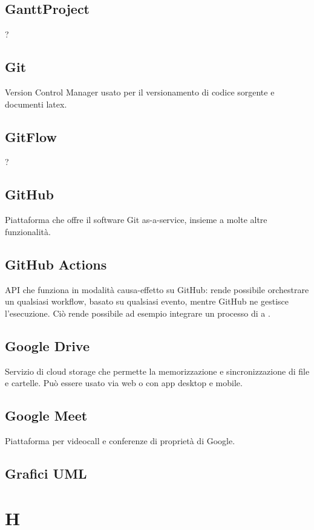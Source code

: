 \subsection*{GanttProject}
?

\subsection*{Git}
Version Control Manager usato per il versionamento di codice sorgente e documenti latex.

\subsection*{GitFlow}
?

\subsection*{GitHub}
Piattaforma che offre il software Git as-a-service, insieme a molte altre funzionalità.

\subsection*{GitHub Actions}
API che funziona in modalità causa-effetto su GitHub: rende possibile orchestrare un qualsiasi workflow, basato su qualsiasi evento, mentre GitHub ne gestisce l’esecuzione. Ciò rende possibile ad esempio integrare un processo di  a .

\subsection*{Google Drive}
Servizio di cloud storage che permette la memorizzazione e sincronizzazione di file e cartelle. Può essere usato via web o con app desktop e mobile.

\subsection*{Google Meet}
Piattaforma per videocall e conferenze di proprietà di Google.

\subsection*{Grafici UML}



\section*{H}
